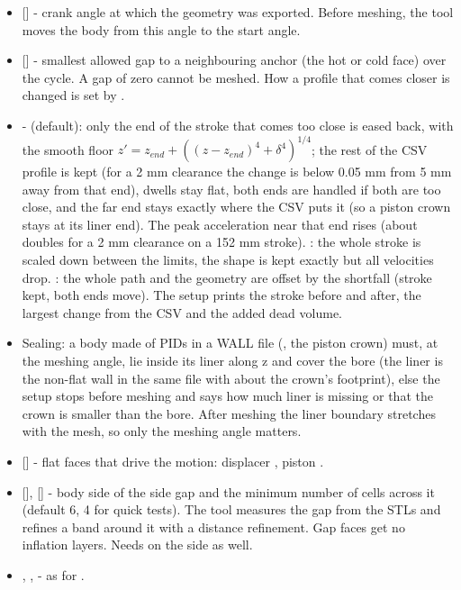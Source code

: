\begin{itemize}
    \item {} [] - crank angle at which the geometry was exported. Before meshing, the tool moves the body from this angle to the start angle.
    \item {} [] - smallest allowed gap to a neighbouring anchor (the hot or cold face) over the cycle. A gap of zero cannot be meshed. How a profile that comes closer is changed is set by .
    \item {} -  (default): only the end of the stroke that comes too close is eased back, with the smooth floor $z' = z_{end} + ((z - z_{end})^4 + \delta^4)^{1/4}$; the rest of the CSV profile is kept (for a 2 mm clearance the change is below 0.05 mm from 5 mm away from that end), dwells stay flat, both ends are handled if both are too close, and the far end stays exactly where the CSV puts it (so a piston crown stays at its liner end). The peak acceleration near that end rises (about doubles for a 2 mm clearance on a 152 mm stroke). : the whole stroke is scaled down between the limits, the shape is kept exactly but all velocities drop. : the whole path and the geometry are offset by the shortfall (stroke kept, both ends move). The setup prints the stroke before and after, the largest change from the CSV and the added dead volume.
    \item Sealing: a body made of PIDs in a WALL file (, the piston crown) must, at the meshing angle, lie inside its liner along z and cover the bore (the liner is the non-flat wall in the same file with about the crown's footprint), else the setup stops before meshing and says how much liner is missing or that the crown is smaller than the bore. After meshing the liner boundary stretches with the mesh, so only the meshing angle matters.
    \item {} [] - flat faces that drive the motion: displacer , piston .
    \item {} [],  [] - body side of the side gap and the minimum number of cells across it (default 6, 4 for quick tests). The tool measures the gap from the STLs and refines a band around it with a  distance refinement. Gap faces get no inflation layers. Needs  on the  side as well.
    \item {}, ,  - as for .
\end{itemize}

